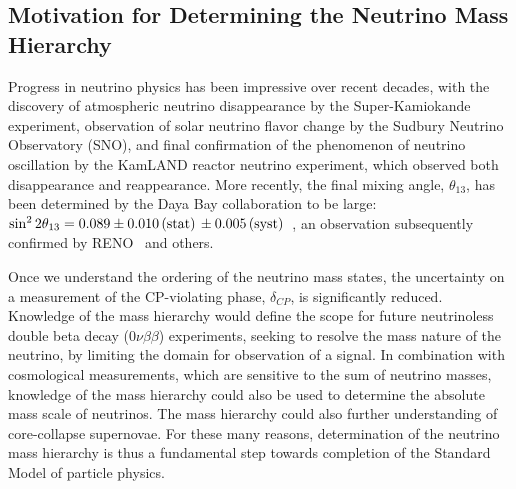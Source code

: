 \subsection{Motivation for Determining the Neutrino Mass Hierarchy}\label{s:mot}
Progress in neutrino physics has been impressive over recent decades,
with the discovery of atmospheric neutrino disappearance by the
Super-Kamiokande experiment, observation of solar neutrino flavor
change by the Sudbury Neutrino Observatory (SNO), and final
confirmation of the phenomenon of neutrino oscillation by the KamLAND
reactor neutrino experiment, which observed both disappearance and
reappearance.  More recently, the final mixing angle, $\theta_{13}$, 
has been determined by the Daya Bay collaboration to be large:
$\sin^22\theta_{13}=0.089\pm0.010\,\textrm{(stat)}\,\pm0.005\,\rm(syst)$~\cite{DB},
an observation subsequently confirmed by RENO~\cite{Reno} and others. 


Once we understand the ordering of the neutrino mass states, the uncertainty on a measurement of the  CP-violating phase, $\delta_{CP}$, is significantly reduced.   
Knowledge of the mass hierarchy would define the scope for future neutrinoless double beta decay ($0\nu\beta\beta$) experiments, seeking to resolve the mass nature of the neutrino, by limiting the domain for observation of a signal.  In combination with cosmological measurements, which are sensitive to the sum of neutrino masses, knowledge of the mass hierarchy could also be used to determine the absolute mass scale of neutrinos.
The mass hierarchy could also further understanding of core-collapse supernovae.  
For these many reasons, determination of the neutrino mass hierarchy is thus a fundamental step towards completion of the Standard Model of particle physics.  



